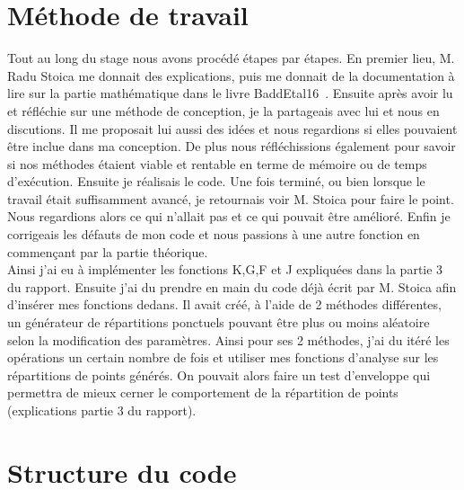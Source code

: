 \documentclass[stage2a]{tnreport}
\begin{document}
\section{Méthode de travail}

Tout au long du stage nous avons procédé étapes par étapes. En premier lieu, M. Radu Stoica me donnait des explications, puis me donnait de la documentation à lire sur la partie mathématique dans le livre BaddEtal16~\cite{BaddEtal16}. Ensuite après avoir lu et réfléchie sur une méthode de conception, je la partageais avec lui et nous en discutions. Il me proposait lui aussi des idées et nous regardions si elles pouvaient être inclue dans ma conception. De plus nous réfléchissions également pour savoir si nos méthodes étaient viable et rentable en terme de mémoire ou de temps d'exécution. Ensuite je réalisais le code. Une fois terminé, ou bien lorsque le travail était suffisamment avancé, je retournais voir M. Stoica pour faire le point. Nous regardions alors ce qui n'allait pas et ce qui pouvait être amélioré. Enfin je corrigeais les défauts de mon code et nous passions à une autre fonction en commençant par la partie théorique.\\

Ainsi j'ai eu à implémenter les fonctions K,G,F et J expliquées dans la partie 3 du rapport. Ensuite j'ai du prendre en main du code déjà écrit par M. Stoica afin d'insérer mes fonctions dedans. Il avait créé, à l'aide de 2 méthodes différentes, un générateur de répartitions ponctuels pouvant être plus ou moins aléatoire selon la modification des paramètres. Ainsi pour ses 2 méthodes, j'ai du itéré les opérations un certain nombre de fois et utiliser mes fonctions d'analyse sur les répartitions de points générés. On pouvait alors faire un test d'enveloppe qui permettra de mieux cerner le comportement de la répartition de points (explications partie 3 du rapport).\\

\newpage

\section{Structure du code}
\end{document}
